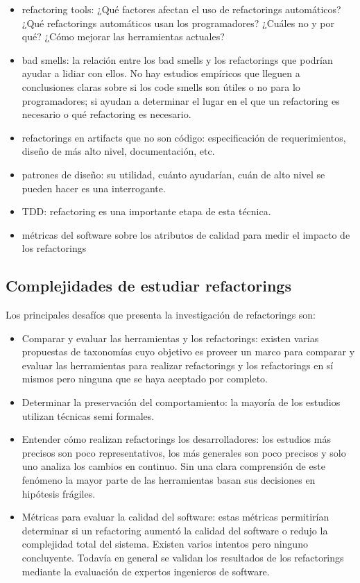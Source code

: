 \begin{itemize}
    \item refactoring tools: ¿Qué factores afectan el uso de refactorings
      automáticos? ¿Qué refactorings automáticos usan los programadores? ¿Cuáles
      no y por qué? ¿Cómo mejorar las herramientas actuales?
    \item bad smells: la relación entre los bad smells y los refactorings que
      podrían ayudar a lidiar con ellos. No hay estudios empíricos que lleguen a
      conclusiones claras sobre si los code smells son útiles o no para lo
      programadores; si ayudan a determinar el lugar en el que un refactoring es
      necesario o qué refactoring es necesario.
    \item refactorings en artifacts que no son código: especificación de
      requerimientos, diseño de más alto nivel, documentación, etc.
    \item patrones de diseño: su utilidad, cuánto ayudarían, cuán de alto nivel
      se pueden hacer es una interrogante.
    \item TDD: refactoring es una importante etapa de esta técnica.
    \item métricas del software sobre los atributos de calidad para medir el
      impacto de los refactorings
\end{itemize}


\subsection{Complejidades de estudiar refactorings}
Los principales desafíos que presenta la investigación de refactorings son:

\begin{itemize}
    \item Comparar y evaluar las herramientas y los refactorings: existen varias propuestas de taxonomías cuyo
    objetivo es proveer un marco para comparar y evaluar las herramientas para realizar refactorings y los
    refactorings en sí mismos pero ninguna que se haya aceptado por completo.
    \item Determinar la preservación del comportamiento: la mayoría de los estudios utilizan
    técnicas semi formales.
    \item Entender cómo realizan refactorings los desarrolladores: los estudios más precisos son
    poco representativos, los más generales son poco precisos y solo uno analiza los cambios en
    continuo. Sin una clara comprensión de este fenómeno la mayor parte de las herramientas basan
    sus decisiones en hipótesis frágiles.
    \item Métricas para evaluar la calidad del software: estas métricas permitirían determinar si un
    refactoring aumentó la calidad del software o redujo la complejidad total del sistema. Existen 
    varios intentos pero ninguno concluyente. Todavía en general se validan los resultados de los
    refactorings mediante la evaluación de expertos ingenieros de software.
\end{itemize}


